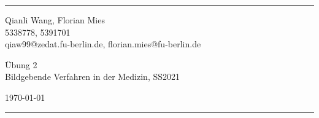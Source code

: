 \documentclass[a4paper]{article}
\begin{document}

\fancyhead[C]{}
\hrule \medskip %
\begin{minipage}{0.295\textwidth} 
\raggedright
\footnotesize
Qianli Wang, Florian Mies \hfill\\   
5338778, 5391701\hfill\\
qiaw99@zedat.fu-berlin.de, florian.mies@fu-berlin.de
\end{minipage}
\begin{minipage}{0.4\textwidth} 
\centering 
\large 
Übung 2\\ 
\normalsize 
Bildgebende Verfahren in der Medizin, SS2021\\ 
\end{minipage}
\begin{minipage}{0.295\textwidth} 
\raggedleft
\today\hfill\\
\end{minipage}
\medskip\hrule 
\bigskip




\bigskip

\end{document}
